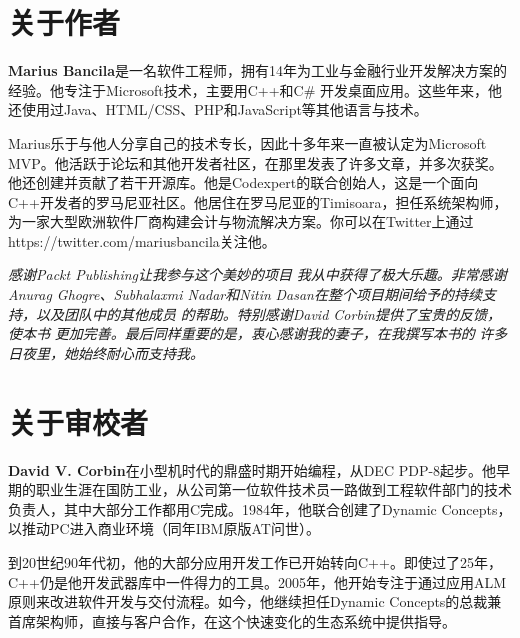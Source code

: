 
\section*{关于作者}



\textbf{Marius Bancila}是一名软件工程师，拥有14年为工业与金融行业开发解决方案的经验。他专注于Microsoft技术，主要用C++和C\# 开发桌面应用。这些年来，他还使用过Java、HTML/CSS、PHP和JavaScript等其他语言与技术。



Marius乐于与他人分享自己的技术专长，因此十多年来一直被认定为Microsoft MVP。他活跃于论坛和其他开发者社区，在那里发表了许多文章，并多次获奖。他还创建并贡献了若干开源库。他是Codexpert的联合创始人，这是一个面向C++开发者的罗马尼亚社区。他居住在罗马尼亚的Timisoara，担任系统架构师，为一家大型欧洲软件厂商构建会计与物流解决方案。你可以在Twitter上通过https://\allowbreak{}twitter.\allowbreak{}com/\allowbreak{}mariusbancila关注他。



\textit{感谢Packt Publishing让我参与这个美妙的项目} \textit{我从中获得了极大乐趣。非常感谢Anurag Ghogre、Subhalaxmi Nadar和Nitin} \textit{Dasan在整个项目期间给予的持续支持，以及团队中的其他成员} \textit{的帮助。特别感谢David Corbin提供了宝贵的反馈，使本书} \textit{更加完善。最后同样重要的是，衷心感谢我的妻子，在我撰写本书的} \textit{许多日夜里，她始终耐心而支持我。}



\section*{关于审校者}



\textbf{David V. Corbin}在小型机时代的鼎盛时期开始编程，从DEC PDP-8起步。他早期的职业生涯在国防工业，从公司第一位软件技术员一路做到工程软件部门的技术负责人，其中大部分工作都用C完成。1984年，他联合创建了Dynamic Concepts，以推动PC进入商业环境（同年IBM原版AT问世）。



到20世纪90年代初，他的大部分应用开发工作已开始转向C++。即使过了25年，C++仍是他开发武器库中一件得力的工具。2005年，他开始专注于通过应用ALM原则来改进软件开发与交付流程。如今，他继续担任Dynamic Concepts的总裁兼首席架构师，直接与客户合作，在这个快速变化的生态系统中提供指导。



